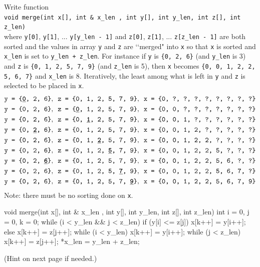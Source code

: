 

\nextq
Write function \\
\verb!void merge(int x[], int & x_len , int y[], int y_len, int z[], int z_len)!
\\
where
\verb!y[0]!,
\verb!y[1]!, ...
\verb!y[y_len - 1]!
and
\verb!z[0]!,
\verb!z[1]!, ...
\verb!z[z_len - 1]!
are both sorted
and
the values in array \verb!y! and \verb!z! are
\lq\lq merged" into \verb!x! so that
\verb!x! is sorted and \verb!x_len! is
set to \verb!y_len + z_len!.
For instance if \verb!y! is \verb!{0, 2, 6}!
(and \verb!y_len! is 3)
and \verb!z! is \verb!{0, 1, 2, 5, 7, 9}! (and \verb!z_len! is 5),
then \verb!x!
becomes \verb!{0, 0, 1, 2, 2, 5, 6, 7}!
and \verb!x_len! is 8.
Iteratively, the least among what is left in \verb!y! and \verb!z! is
selected to be placed in \verb!x!.
{\small
\begin{align*}
&\texttt{y = \{\textbf{\underline{0}}, 2, 6\}}, \,\,\,
  \texttt{z = \{0, 1, 2, 5, 7, 9\}}, \,\,\,
  \texttt{x = \{0, ?, ?, ?, ?, ?, ?, ?, ?\}}
\\
&\texttt{y = \{0, 2, 6\}}, \,\,\,
  \texttt{z = \{\textbf{\underline{0}}, 1, 2, 5, 7, 9\}}, \,\,\,
  \texttt{x = \{0, 0, ?, ?, ?, ?, ?, ?, ?\}}
\\
&\texttt{y = \{0, 2, 6\}}, \,\,\,
  \texttt{z = \{0, \textbf{\underline{1}}, 2, 5, 7, 9\}}, \,\,\,
  \texttt{x = \{0, 0, 1, ?, ?, ?, ?, ?, ?\}}
\\
&\texttt{y = \{0, \textbf{\underline{2}}, 6\}}, \,\,\,
  \texttt{z = \{0, 1, 2, 5, 7, 9\}}, \,\,\,
  \texttt{x = \{0, 0, 1, 2, ?, ?, ?, ?, ?\}}
\\
&\texttt{y = \{0, 2, 6\}}, \,\,\,
  \texttt{z = \{0, 1, \textbf{\underline{2}}, 5, 7, 9\}}, \,\,\,
  \texttt{x = \{0, 0, 1, 2, 2, ?, ?, ?, ?\}}
  \\
&\texttt{y = \{0, 2, 6\}}, \,\,\,
  \texttt{z = \{0, 1, 2, \textbf{\underline{5}}, 7, 9\}}, \,\,\,
  \texttt{x = \{0, 0, 1, 2, 2, 5, ?, ?, ?\}}
  \\
&\texttt{y = \{0, 2, \textbf{\underline{6}}\}}, \,\,\,
  \texttt{z = \{0, 1, 2, 5, 7, 9\}}, \,\,\,
  \texttt{x = \{0, 0, 1, 2, 2, 5, 6, ?, ?\}}
  \\
&\texttt{y = \{0, 2, 6\}}, \,\,\,
  \texttt{z = \{0, 1, 2, 5, \textbf{\underline{7}}, 9\}}, \,\,\,
  \texttt{x = \{0, 0, 1, 2, 2, 5, 6, 7, ?\}}
  \\
&\texttt{y = \{0, 2, 6\}}, \,\,\,
  \texttt{z = \{0, 1, 2, 5, 7, \textbf{\underline{9}}\}}, \,\,\,
  \texttt{x = \{0, 0, 1, 2, 2, 5, 6, 7, 9\}}
\end{align*}
}%
Note: there must be no sorting done on \verb!x!.
\\
\ANSWER
\begin{answercode}
void merge(int x[], int & x_len , int y[], int y_len, int z[], int z_len)
{
  int i = 0, j = 0, k = 0;
  while (i < y_len && j < z_len)
  {
    if (y[i] <= z[j]) x[k++] = y[i++];
    else x[k++] = z[j++];
  }
  while (i < y_len)
  {
    x[k++] = y[i++];
  }
  while (j < z_len)
  {
    x[k++] = z[j++];
  }
  *x_len = y_len + z_len;
}
\end{answercode}
(Hint on next page if needed.)

